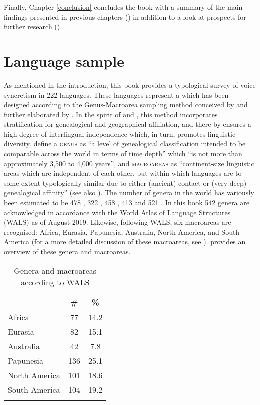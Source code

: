 Finally, Chapter \ref{conclusion} concludes the book with a summary of the main findings presented in previous chapters () in addition to a look at prospects for further research ().

\section{Language sample} \label{sample}
As mentioned in the introduction, this book provides a typological survey of voice syncretism in 222 languages. These languages represent a  which has been designed according to the Genus-Macroarea sampling method conceived by \cite{miestamo:2003, miestamo:2005} and further elaborated by \cite[247ff.]{miestamo:al:2016}. In the spirit of \cite{bell:1978} and \cite{dryer:1989, dryer:1992, dryer:2000}, this method incorporates stratification for genealogical and geographical affiliation, and there-by ensures a high degree of interlingual independence which, in turn, promotes linguistic diversity. \cite[238ff.]{miestamo:al:2016} define a \textsc{genus} as “a level of genealogical classification intended to be comparable across the world in terms of time depth” which “is not more than approximately 3,500 to 4,000 years”, and \textsc{macroareas} as “continent-size linguistic areas which are independent of each other, but within which languages are to some extent typologically similar due to either (ancient) contact or (very deep) genealogical affinity” (see also \citealt[84]{dryer:1992}). The number of genera in the world has variously been estimated to be 478 \citep{bell:1978}, 322 \citep{dryer:1989}, 458 \citep{dryer:2005}, 413 \citep{miestamo:2005} and 521 \citep{dryer:2013, miestamo:al:2016}. In this book 542 genera are acknowledged in accordance with the World Atlas of Language Structures (WALS) as of August 2019. Likewise, following WALS, six macroareas are recognised: Africa, Eurasia, Papunesia, Australia, North America, and South America (for a more detailed discussion of these macroareas, see \citealt{hammarstrom:donohue:2014}).  provides an overview of these genera and macroareas. 

\begin{table}
	\begin{tabularx}{.4\textwidth}{lcc}
		\lsptoprule
		& \# & \% \\
		\midrule
		Africa & 77 & 14.2 \\
		Eurasia & 82 & 15.1 \\
		Australia & 42 & 7.8 \\
		Papunesia & 136 & 25.1 \\
		North America & 101 & 18.6 \\
		South America & 104 & 19.2 \\
		\lspbottomrule
	\end{tabularx}
	\caption{Genera and macroareas according to WALS}
	\label{tab:ch1:wals}
\end{table} 

